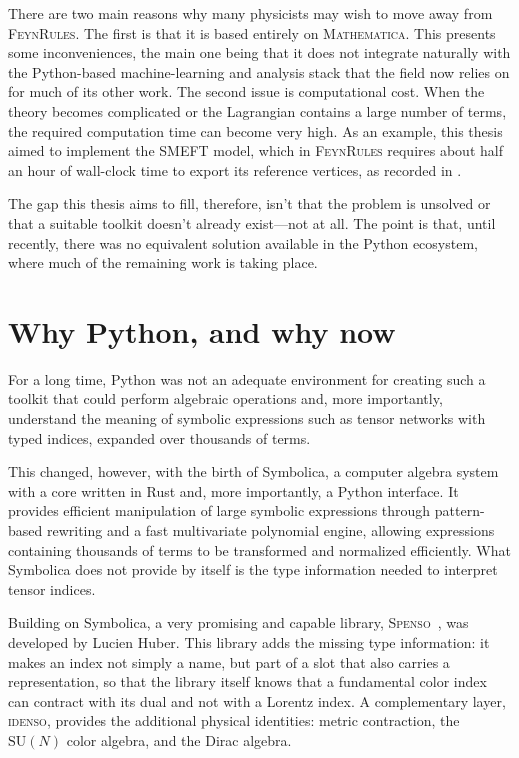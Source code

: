 There are two main reasons why many physicists may wish to move away from \textsc{FeynRules}. The first is that it is based entirely on \textsc{Mathematica}. This presents some inconveniences, the main one being that it does not integrate naturally with the Python-based machine-learning and analysis stack that the field now relies on for much of its other work. The second issue is computational cost. When the theory becomes complicated or the Lagrangian contains a large number of terms, the required computation time can become very high. As an example, this thesis aimed to implement the SMEFT model, which in \textsc{FeynRules} requires about half an hour of wall-clock time to export its reference vertices, as recorded in
.

The gap this thesis aims to fill, therefore, isn't that the problem is unsolved or that a suitable toolkit doesn't already exist—not at all.
The point is that, until recently, there was no equivalent solution available in the Python ecosystem, where much of the remaining work is taking place.

\section{Why Python, and why now}
\label{sec:intro-why-now}

For a long time, Python was not an adequate environment for creating such a toolkit that could perform algebraic operations and, more importantly, understand the meaning of symbolic expressions such as tensor networks with typed indices, expanded over thousands of terms.

This changed, however, with the birth of Symbolica, a computer algebra system with a core written in Rust and, more importantly, a Python interface. It provides efficient manipulation of large symbolic expressions through pattern-based rewriting and a fast multivariate polynomial engine, allowing expressions containing thousands of terms to be transformed and normalized efficiently. What Symbolica does not provide by itself is the type information needed to interpret tensor indices.

Building on Symbolica, a very promising and capable library, \textsc{Spenso}~\cite{spenso}, was developed by Lucien Huber. This library adds the missing type information: it makes an
index not simply a name, but part of a slot that also carries a representation, so that the
library itself knows that a fundamental color index can contract with its
dual and not with a Lorentz index. A complementary layer, \textsc{idenso}, provides the
additional physical identities: metric contraction, the $\mathrm{SU}(N)$ color algebra, and the Dirac algebra.

